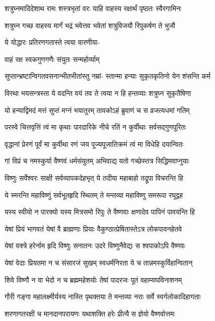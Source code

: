 \twolineshloka
{शत्रुघ्नमादिदेशाथ रामः शस्त्रभृतां वरः}
{याहि वाहस्य रक्षार्थं पृष्ठतः स्वैरगामिनः}%

\twolineshloka
{शत्रुघ्न गच्छ वाहस्य मार्गं भद्रं भवेत्तव}
{भवेतां शत्रुविजयौ रिपुकर्षण ते भुजौ}%

ये योद्धारः प्रतिरणगतास्ते त्वया वारणीया-

वाहं रक्ष स्वकगुणगणैः संयुतः सन्महोर्व्याम्

\twolineshloka
{सुप्तान्भ्रष्टान्विगतवसनान्भीतभीतांस्तु नम्रां-}
{स्तान्मा हन्याः सुकृतकृतिनो येन शंसन्ति कर्म}%

\twolineshloka
{विरथा भयसन्त्रस्ता ये वदन्ति वयं तव}
{ते त्वया न हि हन्तव्याः शत्रुघ्न सुकृतैषिणा}%

\twolineshloka
{यो हन्याद्विमदं मत्तं सुप्तं मग्नं भयातुरम्}
{तावकोऽहं ब्रुवाणं च स व्रजत्यधमां गतिम्}%

\twolineshloka
{परस्वे चित्तवृत्तिं त्वं मा कृथाः पारदारिके}
{नीचे रतिं न कुर्वीथाः सर्वसद्गुणपूरितः}%

\twolineshloka
{वृद्धानां प्रेरणं पूर्वं मा कुर्वीथा रणं जय}
{पूज्यपूजातिक्रमं त्वं मा विधेहि दयान्वितः}%

\twolineshloka
{गां विप्रं च नमस्कुर्या वैष्णवं धर्मसंयुतम्}
{अभिवाद्य यतो गच्छेस्तत्र सिद्धिमवाप्नुयाः}%

\twolineshloka
{विष्णुः सर्वेश्वरः साक्षी सर्वव्यापकदेहभृत्}
{ये तदीया महाबाहो तद्रूपा विचरन्ति हि}%

\twolineshloka
{ये स्मरन्ति महाविष्णुं सर्वभूतहृदि स्थितम्}
{ते मन्तव्या महाविष्णु समरूपा रघूद्वह}%

\twolineshloka
{यस्य स्वीयो न पारक्यो यस्य मित्रसमो रिपुः}
{ते वैष्णवाः क्षणादेव पापिनं पावयन्ति हि}%

\twolineshloka
{येषां प्रियं भागवतं येषां वै ब्राह्मणाः प्रियाः}
{वैकुण्ठात्प्रेषितास्तेऽत्र लोकपावनहेतवे}%

\twolineshloka
{येषां वक्त्रे हरेर्नाम हृदि विष्णुः सनातनः}
{उदरे विष्णुनैवेद्यः स श्वपाकोऽपि वैष्णवः}%

\twolineshloka
{येषां वेदाः प्रियतमा न च संसारजं सुखम्}
{स्वधर्मनिरता ये च तान्नमस्कुर्विहान्वितान्}%

\twolineshloka
{शिवे विष्णौ न वा भेदो न च ब्रह्ममहेशयोः}
{तेषां पादरजः पूतं वहाम्यघविनाशनम्}%

\twolineshloka
{गौरी गङ्गा महालक्ष्मीर्यस्य नास्ति पृथक्तया}
{ते मन्तव्या नराः सर्वे स्वर्गलोकादिहागताः}%

\twolineshloka
{शरणागतरक्षी च मानदानपरायणः}
{यथाशक्ति हरेः प्रीत्यै स ज्ञेयो वैष्णवोत्तमः}%

